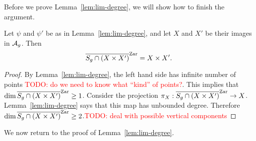 \documentclass{amsart}
\begin{document}
Before we prove Lemma~\ref{lem:lim-degree}, we will show how to finish the argument.

\begin{corollary}
  Let $\psi$ and $\psi'$ be as in Lemma~\ref{lem:lim-degree}, and let $X$ and $X'$ be their images in $\mathcal{A}_g$. Then
  \[
    \overline{S_g \cap (X \times X')}^\mathrm{Zar} = X \times X'.
  \]
\end{corollary}
\begin{proof}
  By Lemma~\ref{lem:lim-degree}, the left hand side has infinite number of points \textcolor{red}{TODO: do we need to know what ``kind'' of points?}. This implies that $\dim \overline{S_g \cap (X \times X')}^\mathrm{Zar} \geq 1$. Consider the projection $\pi_X: \overline{S_g \cap (X \times X')}^\mathrm{Zar} \to X$. Lemma~\ref{lem:lim-degree} says that this map has unbounded degree. Therefore $\dim \overline{S_g \cap (X \times X')}^\mathrm{Zar} \geq 2$.\textcolor{red}{TODO: deal with possible vertical components}
\end{proof}

We now return to the proof of Lemma~\ref{lem:lim-degree}.
\end{document}

